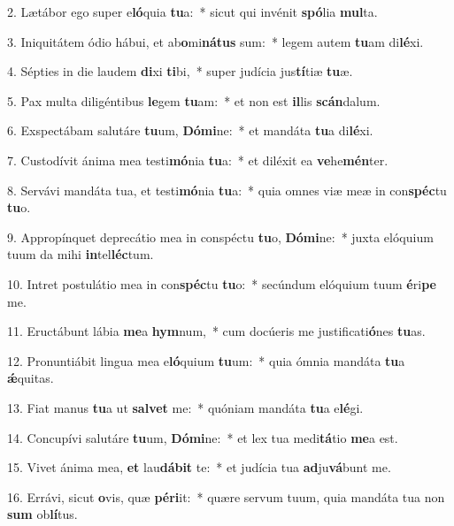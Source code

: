 2. Lætábor ego super e\textbf{ló}quia \textbf{tu}a:~*  sicut qui invénit \textbf{spó}lia \textbf{mul}ta.\

3. Iniquitátem ódio hábui, et ab\textbf{o}mi\textbf{ná}\textbf{tus} sum:~*  legem autem \textbf{tu}am di\textbf{lé}xi.\

4. Sépties in die laudem \textbf{di}xi \textbf{ti}bi,~*  super judícia jus\textbf{tí}tiæ \textbf{tu}æ.\

5. Pax multa diligéntibus \textbf{le}gem \textbf{tu}am:~*  et non est \textbf{il}lis \textbf{scán}dalum.\

6. Exspectábam salutáre \textbf{tu}um, \textbf{Dó}\textbf{mi}ne:~*  et mandáta \textbf{tu}a di\textbf{lé}xi.\

7. Custodívit ánima mea testi\textbf{mó}nia \textbf{tu}a:~*  et diléxit ea \textbf{ve}he\textbf{mén}ter.\

8. Servávi mandáta tua, et testi\textbf{mó}nia \textbf{tu}a:~*  quia omnes viæ meæ in con\textbf{spéc}tu \textbf{tu}o.\

9. Appropínquet deprecátio mea in conspéctu \textbf{tu}o, \textbf{Dó}\textbf{mi}ne:~*  juxta elóquium tuum da mihi \textbf{in}tel\textbf{léc}tum.\

10. Intret postulátio mea in con\textbf{spéc}tu \textbf{tu}o:~*  secúndum elóquium tuum \textbf{é}ri\textbf{pe} me.\

11. Eructábunt lábia \textbf{me}a \textbf{hym}num,~*  cum docúeris me justificati\textbf{ó}nes \textbf{tu}as.\

12. Pronuntiábit lingua mea e\textbf{ló}quium \textbf{tu}um:~*  quia ómnia mandáta \textbf{tu}a \textbf{ǽ}quitas.\

13. Fiat manus \textbf{tu}a ut \textbf{sal}\textbf{vet} me:~*  quóniam mandáta \textbf{tu}a e\textbf{lé}gi.\

14. Concupívi salutáre \textbf{tu}um, \textbf{Dó}\textbf{mi}ne:~*  et lex tua medi\textbf{tá}tio \textbf{me}a est.\

15. Vivet ánima mea, \textbf{et} lau\textbf{dá}\textbf{bit} te:~*  et judícia tua \textbf{ad}ju\textbf{vá}bunt me.\

16. Errávi, sicut \textbf{o}vis, quæ \textbf{pér}\textbf{i}it:~*  quære servum tuum, quia mandáta tua non \textbf{sum} ob\textbf{lí}tus.\

